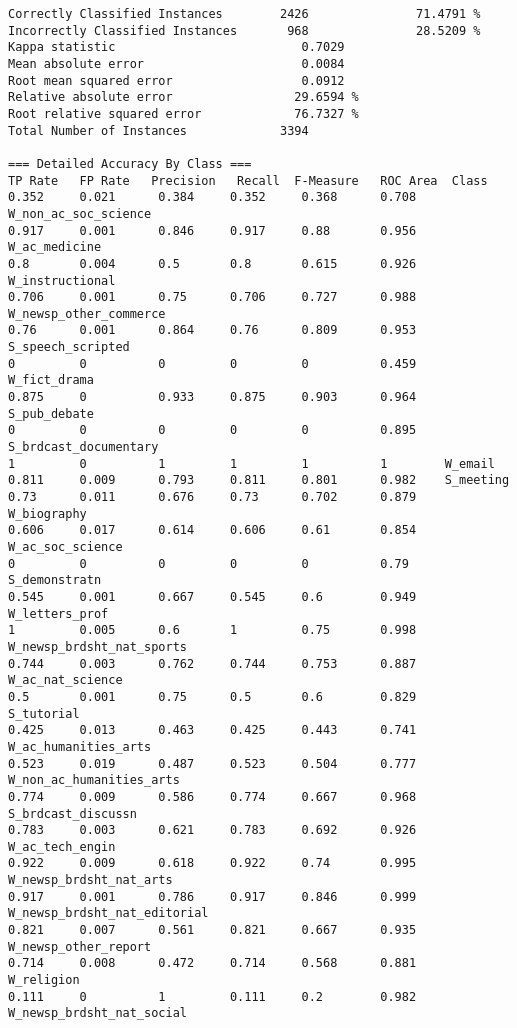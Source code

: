 
{\small
\begin{verbatim}
Correctly Classified Instances        2426               71.4791 %
Incorrectly Classified Instances       968               28.5209 %
Kappa statistic                          0.7029
Mean absolute error                      0.0084
Root mean squared error                  0.0912
Relative absolute error                 29.6594 %
Root relative squared error             76.7327 %
Total Number of Instances             3394     

=== Detailed Accuracy By Class ===
TP Rate   FP Rate   Precision   Recall  F-Measure   ROC Area  Class
0.352     0.021      0.384     0.352     0.368      0.708    W_non_ac_soc_science
0.917     0.001      0.846     0.917     0.88       0.956    W_ac_medicine
0.8       0.004      0.5       0.8       0.615      0.926    W_instructional
0.706     0.001      0.75      0.706     0.727      0.988    W_newsp_other_commerce
0.76      0.001      0.864     0.76      0.809      0.953    S_speech_scripted
0         0          0         0         0          0.459    W_fict_drama
0.875     0          0.933     0.875     0.903      0.964    S_pub_debate
0         0          0         0         0          0.895    S_brdcast_documentary
1         0          1         1         1          1        W_email
0.811     0.009      0.793     0.811     0.801      0.982    S_meeting
0.73      0.011      0.676     0.73      0.702      0.879    W_biography
0.606     0.017      0.614     0.606     0.61       0.854    W_ac_soc_science
0         0          0         0         0          0.79     S_demonstratn
0.545     0.001      0.667     0.545     0.6        0.949    W_letters_prof
1         0.005      0.6       1         0.75       0.998    W_newsp_brdsht_nat_sports
0.744     0.003      0.762     0.744     0.753      0.887    W_ac_nat_science
0.5       0.001      0.75      0.5       0.6        0.829    S_tutorial
0.425     0.013      0.463     0.425     0.443      0.741    W_ac_humanities_arts
0.523     0.019      0.487     0.523     0.504      0.777    W_non_ac_humanities_arts
0.774     0.009      0.586     0.774     0.667      0.968    S_brdcast_discussn
0.783     0.003      0.621     0.783     0.692      0.926    W_ac_tech_engin
0.922     0.009      0.618     0.922     0.74       0.995    W_newsp_brdsht_nat_arts
0.917     0.001      0.786     0.917     0.846      0.999    W_newsp_brdsht_nat_editorial
0.821     0.007      0.561     0.821     0.667      0.935    W_newsp_other_report
0.714     0.008      0.472     0.714     0.568      0.881    W_religion
0.111     0          1         0.111     0.2        0.982    W_newsp_brdsht_nat_social

\end{verbatim}}
